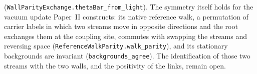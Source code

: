(\texttt{WallParityExchange.thetaBar\_from\_light}). The symmetry itself holds for the vacuum update Paper~II constructs: its native reference walk, a permutation of carrier labels in which two streams move in opposite directions and the root exchanges them at the coupling site, commutes with swapping the streams and reversing space (\texttt{ReferenceWalkParity.walk\_parity}), and its stationary backgrounds are invariant (\texttt{backgrounds\_agree}). The identification of those two streams with the two walls, and the positivity of the links, remain open.

